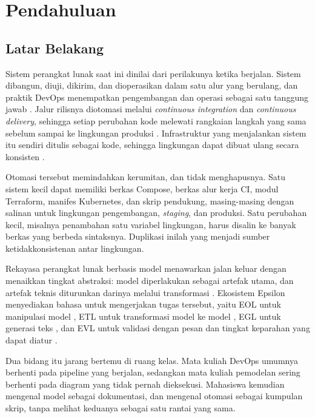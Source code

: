 \chapter{Pendahuluan}

\section*{Latar Belakang}

Sistem perangkat lunak saat ini dinilai dari perilakunya ketika berjalan. Sistem
dibangun, diuji, dikirim, dan dioperasikan dalam satu alur yang berulang, dan
praktik DevOps menempatkan pengembangan dan operasi sebagai satu tanggung jawab
\cite{bass2015devops}. Jalur rilisnya diotomasi melalui \textit{continuous
integration} dan \textit{continuous delivery}, sehingga setiap perubahan kode
melewati rangkaian langkah yang sama sebelum sampai ke lingkungan produksi
\cite{humble2010cd}. Infrastruktur yang menjalankan sistem itu sendiri ditulis
sebagai kode, sehingga lingkungan dapat dibuat ulang secara konsisten
\cite{morris2021iac}.

Otomasi tersebut memindahkan kerumitan, dan tidak menghapusnya. Satu sistem kecil
dapat memiliki berkas Compose, berkas alur kerja CI, modul Terraform, manifes
Kubernetes, dan skrip pendukung, masing-masing dengan salinan untuk lingkungan
pengembangan, \textit{staging}, dan produksi. Satu perubahan kecil, misalnya
penambahan satu variabel lingkungan, harus disalin ke banyak berkas yang berbeda
sintaksnya. Duplikasi inilah yang menjadi sumber ketidakkonsistenan antar
lingkungan.

Rekayasa perangkat lunak berbasis model menawarkan jalan keluar dengan menaikkan
tingkat abstraksi: model diperlakukan sebagai artefak utama, dan artefak teknis
diturunkan darinya melalui transformasi \cite{schmidt2006mde, brambilla2017mdse}.
Ekosistem Epsilon menyediakan bahasa untuk mengerjakan tugas tersebut, yaitu EOL
untuk manipulasi model \cite{kolovos2006eol}, ETL untuk transformasi model ke
model \cite{kolovos2008etl}, EGL untuk generasi teks \cite{rose2008egl}, dan EVL
untuk validasi dengan pesan dan tingkat keparahan yang dapat diatur
\cite{kolovos2009evl}.

Dua bidang itu jarang bertemu di ruang kelas. Mata kuliah DevOps umumnya berhenti
pada pipeline yang berjalan, sedangkan mata kuliah pemodelan sering berhenti pada
diagram yang tidak pernah dieksekusi. Mahasiswa kemudian mengenal model sebagai
dokumentasi, dan mengenal otomasi sebagai kumpulan skrip, tanpa melihat keduanya
sebagai satu rantai yang sama.

